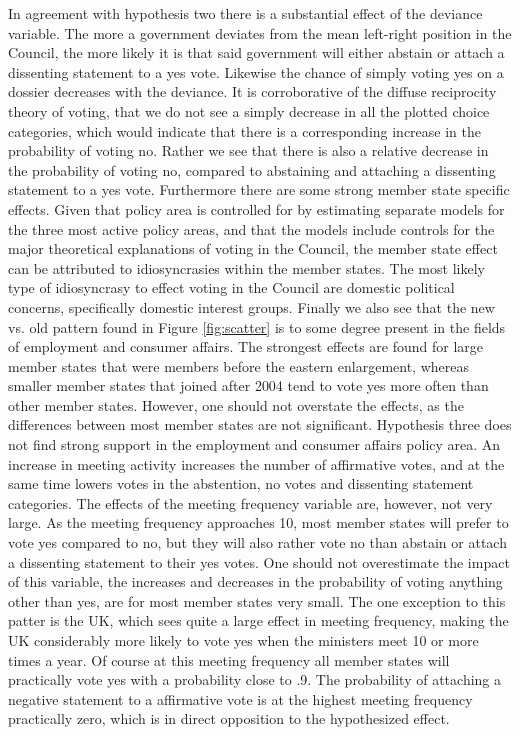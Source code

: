 In agreement with hypothesis two there is a substantial effect of the deviance variable. The more a government deviates from the mean left-right position in the Council, the more likely it is that said government will either abstain or attach a dissenting statement to a yes vote. Likewise the chance of simply voting yes on a dossier decreases with the deviance. It is corroborative of the diffuse reciprocity theory of voting, that we do not see a simply decrease in all the plotted choice categories, which would indicate that there is a corresponding increase in the probability of voting no. Rather we see that there is also a relative decrease in the probability of voting no, compared to abstaining and attaching a dissenting statement to a yes vote. Furthermore there are some strong member state specific effects. Given that policy area is controlled for by estimating separate models for the three most active policy areas, and that the models include controls for the major theoretical explanations of voting in the Council, the member state effect can be attributed to idiosyncrasies within the member states. The most likely type of idiosyncrasy to effect voting in the Council are domestic political concerns, specifically domestic interest groups. Finally we also see that the new vs. old pattern found in Figure \ref{fig:scatter} is to some degree present in the fields of employment and consumer affairs. The strongest effects are found for large member states that were members before the eastern enlargement, whereas smaller member states that joined after 2004 tend to vote yes more often than other member states. However, one should not overstate the effects, as the differences between most member states are not significant. Hypothesis three does not find strong support in the employment and consumer affairs policy area. An increase in meeting activity increases the number of affirmative votes, and at the same time lowers votes in the abstention, no votes and dissenting statement categories. The effects of the meeting frequency variable are, however, not very large. As the meeting frequency approaches 10, most member states will prefer to vote yes compared to no, but they will also rather vote no than abstain or attach a dissenting statement to their yes votes. One should not overestimate the impact of this variable, the increases and decreases in the probability of voting anything other than yes, are for most member states very small. The one exception to this patter is the UK, which sees quite a large effect in meeting frequency, making the UK considerably more likely to vote yes when the ministers meet 10 or more times a year. Of course at this meeting frequency all member states will practically vote yes with a probability close to .9. The probability of attaching a negative statement to a affirmative vote is at the highest meeting frequency practically zero, which is in direct opposition to the hypothesized effect.

